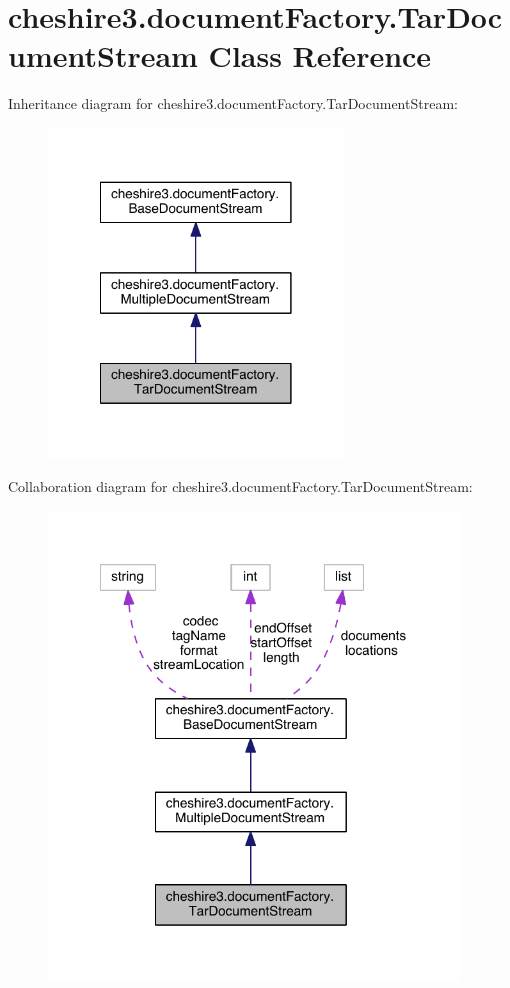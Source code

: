 \hypertarget{classcheshire3_1_1document_factory_1_1_tar_document_stream}{\section{cheshire3.\-document\-Factory.\-Tar\-Document\-Stream Class Reference}
\label{classcheshire3_1_1document_factory_1_1_tar_document_stream}
}


Inheritance diagram for cheshire3.\-document\-Factory.\-Tar\-Document\-Stream\-:
\nopagebreak
\begin{figure}[H]
\begin{center}
\leavevmode
\includegraphics[width=222pt]{classcheshire3_1_1document_factory_1_1_tar_document_stream__inherit__graph}
\end{center}
\end{figure}


Collaboration diagram for cheshire3.\-document\-Factory.\-Tar\-Document\-Stream\-:
\nopagebreak
\begin{figure}[H]
\begin{center}
\leavevmode
\includegraphics[width=309pt]{classcheshire3_1_1document_factory_1_1_tar_document_stream__coll__graph}
\end{center}
\end{figure}
